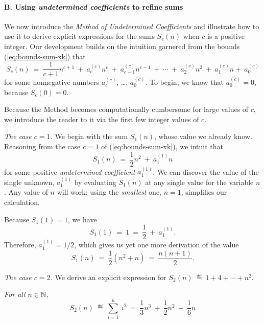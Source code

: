 \paragraph{B. Using {\em undetermined coefficients} to refine sums}

We now introduce the {\em Method of Undetermined Coefficients}
and illustrate how to use it to derive explicit expressions for the
sums $S_c(n)$ when $c$ is a positive integer.  Our development builds
on the intuition garnered from the bounds (\ref{eq:bounds-sum-xk})
that
\[ S_c(n) \ = \ \frac{1}{c+1} n^{c+1} \ + \ a^{(c)}_c n^c \ + \
a^{(c)}_{c-1} n^{c-1} \ + \ \cdots \ + \ a^{(c)}_2 n^2 \ + \ a^{(c)}_1 n
 + \ a^{(c)}_0
\]
for some nonnegative numbers  
$a^{(c)}_c$, \ldots,
$a^{(c)}_0$.  To begin, we know that $a^{(c)}_0 = 0$, because $S_c(0)
= 0$.
\medskip

\noindent {}
\medskip

Because the Method becomes computationally cumbersome for large values
of $c$, we introduce the reader to it via the first few integer values
of $c$.

{\it The case $c=1$.}
%
We begin with the sum $S_1(n)$, whose value we already know.
Reasoning from the case $c=1$ of (\ref{eq:bounds-sum-xk}), we intuit
that
\[ S_1(n) \ = \ \frac{1}{2} n^2 \ + \ a^{(1)}_1 n \]
for some positive {\it undetermined coefficient} $a^{(1)}_1$.  We can
discover the value of the single unknown, $a^{(1)}_1$ by evaluating
$S_1(n)$ at any single value for the variable $n$.  Any value of $n$
will work; using the {\em smallest} one, $n=1$, simplifies our
calculation.

Because $S_1(1) = 1$, we have
\[ S_1(1) \ = \ 1 \ = \ \frac{1}{2} \ + \ a^{(1)}_1. \]
Therefore, $a^{(1)}_1 = 1/2$, which gives us yet one more derivation
of the value
\[ S_1(n) \ = \ \frac{1}{2} \left( n^2 + n \right) \ = \ 
\frac{n(n+1)}{2}.
\]

\medskip

{\it The case $c=2$.}
%
We derive an explicit expression for $S_2(n) \ \eqdef \  1 + 4 +
\cdots + n^2$.

\begin{prop}
{\em For all} $n \in \mathbb{N}$,
\begin{equation}
\label{eq:sum-1-to-nsq}
S_2(n) \ \eqdef \ \sum_{i=1}^n \ i^2 
 \ = \ \frac{1}{3} n^3 \ + \ \frac{1}{2} n^2 \ + \ \frac{1}{6} n
\end{equation}
\end{prop}

